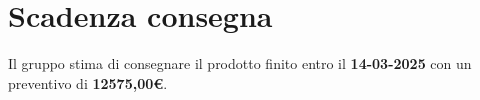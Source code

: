 \section{Scadenza consegna}

Il gruppo stima di consegnare il prodotto finito entro il \textbf{14-03-2025} con un preventivo di \textbf{12575,00\euro}.
